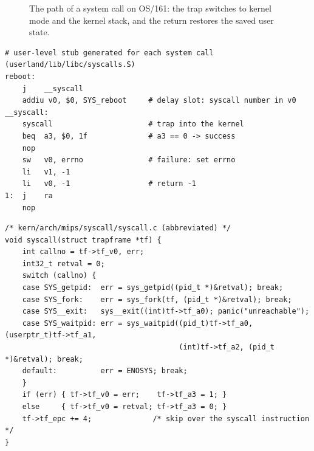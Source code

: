 \begin{figure}[H]
\centering
{}
\caption{The path of a system call on OS/161: the trap switches to kernel
mode and the kernel stack, and the return restores the saved user state.}
\end{figure}

\begin{lstlisting}[style=mips]
# user-level stub generated for each system call (userland/lib/libc/syscalls.S)
reboot:
    j    __syscall
    addiu v0, $0, SYS_reboot     # delay slot: syscall number in v0
__syscall:
    syscall                      # trap into the kernel
    beq  a3, $0, 1f              # a3 == 0 -> success
    nop
    sw   v0, errno               # failure: set errno
    li   v1, -1
    li   v0, -1                  # return -1
1:  j    ra
    nop
\end{lstlisting}

\begin{lstlisting}[style=c]
/* kern/arch/mips/syscall/syscall.c (abbreviated) */
void syscall(struct trapframe *tf) {
    int callno = tf->tf_v0, err;
    int32_t retval = 0;
    switch (callno) {
    case SYS_getpid:  err = sys_getpid((pid_t *)&retval); break;
    case SYS_fork:    err = sys_fork(tf, (pid_t *)&retval); break;
    case SYS__exit:   sys__exit((int)tf->tf_a0); panic("unreachable");
    case SYS_waitpid: err = sys_waitpid((pid_t)tf->tf_a0, (userptr_t)tf->tf_a1,
                                        (int)tf->tf_a2, (pid_t *)&retval); break;
    default:          err = ENOSYS; break;
    }
    if (err) { tf->tf_v0 = err;    tf->tf_a3 = 1; }
    else     { tf->tf_v0 = retval; tf->tf_a3 = 0; }
    tf->tf_epc += 4;              /* skip over the syscall instruction */
}
\end{lstlisting}

